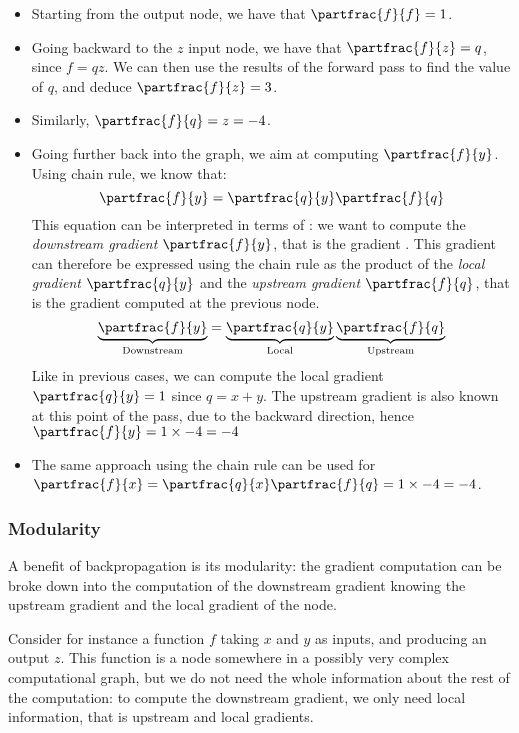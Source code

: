 \begin{itemize}
    \item Starting from the output node, we have that $\partfrac{f}{f}=1$.
    \item Going backward to the $z$ input node, we have that $\partfrac{f}{z}=q$, since $f=qz$. We can then use the results of the forward pass to find the value of $q$, and deduce $\partfrac{f}{z}=3$.
    \item Similarly, $\partfrac{f}{q}=z=-4$.
    \item Going further back into the graph, we aim at computing $\partfrac{f}{y}$. Using chain rule, we know that:
    \begin{equation*}
        \partfrac{f}{y}=\partfrac{q}{y}\partfrac{f}{q}
    \end{equation*}
    This equation can be interpreted in terms of : we want to compute the \emph{downstream gradient} $\partfrac{f}{y}$, that is the gradient . This gradient can therefore be expressed using the chain rule as the product of the \emph{local gradient} $\partfrac{q}{y}$ and the \emph{upstream gradient} $\partfrac{f}{q}$, that is the gradient computed at the previous node.
    \begin{equation*}
        \underbrace{\partfrac{f}{y}}_{\textnormal{Downstream}}=\underbrace{\partfrac{q}{y}}_{\textnormal{Local}} \underbrace{\partfrac{f}{q}}_{\textnormal{Upstream}}
    \end{equation*}
    Like in previous cases, we can compute the local gradient $\partfrac{q}{y}=1$ since $q=x+y$. The upstream gradient is also known at this point of the pass, due to the backward direction, hence $\partfrac{f}{y}=1\times-4=-4$
    \item The same approach using the chain rule can be used for $\partfrac{f}{x}=\partfrac{q}{x}\partfrac{f}{q}=1\times -4=-4$.
\end{itemize}

\subsubsection{Modularity}
A benefit of backpropagation is its modularity: the gradient computation can be broke down into the computation of the downstream gradient knowing the upstream gradient and the local gradient of the node.

Consider for instance a function $f$ taking $x$ and $y$ as inputs, and producing an output $z$. This function is a node somewhere in a possibly very complex computational graph, but we do not need the whole information about the rest of the computation: to compute the downstream gradient, we only need local information, that is upstream and local gradients.

